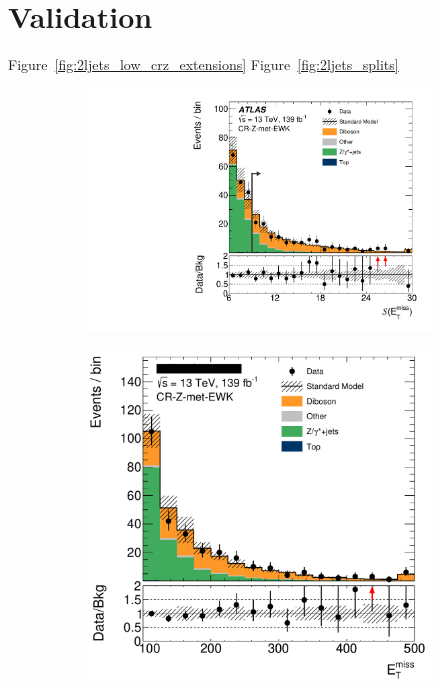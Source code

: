 \section{Validation}
\label{sec:2ljets_validation}
Figure~\ref{fig:2ljets_low_crz_extensions}
Figure~\ref{fig:2ljets_splits}

\begin{figure}[tp]
\centering
\begin{subfigure}{0.48\textwidth}
\centering
\includegraphics[width=\textwidth]{figures/2ljets_aux_CR_Z_met_EWK_met_Sign.pdf}
\caption{}
\end{subfigure}
\hfill
\begin{subfigure}{0.48\textwidth}
\centering
\includegraphics[width=\textwidth]{figures/2ljets_aux_CR_Z_met_EWK_met_Et.png}

\end{subfigure}
\end{figure}
